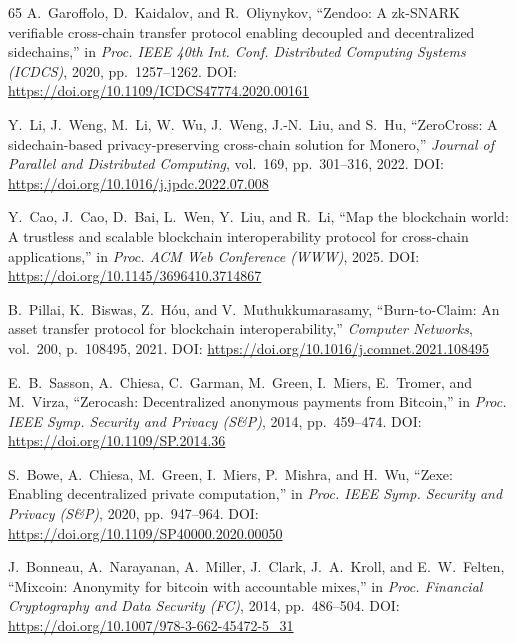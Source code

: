 \documentclass[journal]{IEEEtran}
\begin{document}
\begin{thebibliography}{65}
A.~Garoffolo, D.~Kaidalov, and R.~Oliynykov,
``Zendoo: A zk-SNARK verifiable cross-chain transfer protocol enabling
decoupled and decentralized sidechains,''
in \textit{Proc. IEEE 40th Int. Conf. Distributed Computing Systems (ICDCS)},
2020, pp.~1257--1262.
\newblock DOI: \url{https://doi.org/10.1109/ICDCS47774.2020.00161}

Y.~Li, J.~Weng, M.~Li, W.~Wu, J.~Weng, J.-N.~Liu, and S.~Hu,
``ZeroCross: A sidechain-based privacy-preserving cross-chain solution for
Monero,''
\textit{Journal of Parallel and Distributed Computing}, vol.~169,
pp.~301--316, 2022.
\newblock DOI: \url{https://doi.org/10.1016/j.jpdc.2022.07.008}

Y.~Cao, J.~Cao, D.~Bai, L.~Wen, Y.~Liu, and R.~Li,
``Map the blockchain world: A trustless and scalable blockchain
interoperability protocol for cross-chain applications,''
in \textit{Proc. ACM Web Conference (WWW)}, 2025.
\newblock DOI: \url{https://doi.org/10.1145/3696410.3714867}

B.~Pillai, K.~Biswas, Z.~H\'{o}u, and V.~Muthukkumarasamy,
``Burn-to-Claim: An asset transfer protocol for blockchain interoperability,''
\textit{Computer Networks}, vol.~200, p.~108495, 2021.
\newblock DOI: \url{https://doi.org/10.1016/j.comnet.2021.108495}


E.~B.~Sasson, A.~Chiesa, C.~Garman, M.~Green, I.~Miers, E.~Tromer, and
M.~Virza,
``Zerocash: Decentralized anonymous payments from Bitcoin,''
in \textit{Proc. IEEE Symp. Security and Privacy (S\&P)}, 2014,
pp.~459--474.
\newblock DOI: \url{https://doi.org/10.1109/SP.2014.36}

S.~Bowe, A.~Chiesa, M.~Green, I.~Miers, P.~Mishra, and H.~Wu,
``Zexe: Enabling decentralized private computation,''
in \textit{Proc. IEEE Symp. Security and Privacy (S\&P)}, 2020,
pp.~947--964.
\newblock DOI: \url{https://doi.org/10.1109/SP40000.2020.00050}

J.~Bonneau, A.~Narayanan, A.~Miller, J.~Clark, J.~A.~Kroll, and
E.~W.~Felten,
``Mixcoin: Anonymity for bitcoin with accountable mixes,''
in \textit{Proc. Financial Cryptography and Data Security (FC)}, 2014,
pp.~486--504.
\newblock DOI: \url{https://doi.org/10.1007/978-3-662-45472-5_31}


\end{thebibliography}
\end{document}
